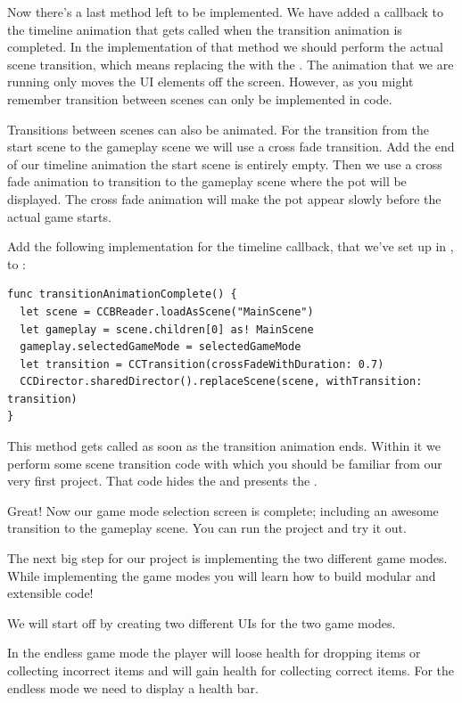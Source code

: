 Now there's a last method left to be implemented. We have added a callback to
the timeline animation that gets called when the transition animation is
completed. In the implementation of that method we should perform the actual
scene transition, which means replacing the  with the
. The animation that we are running only moves the UI
elements off the screen. However, as you might remember transition between
scenes can only be implemented in code.

Transitions between scenes can also be animated. For the
transition from the start scene to the gameplay scene we will use a cross fade
transition. Add the end of our timeline animation the start scene is entirely
empty. Then we use a cross fade animation to transition to the gameplay scene
where the pot will be displayed. The cross fade animation will make the pot
appear slowly before the actual game starts.

\begin{leftbar}
Add the following implementation for the timeline callback, that we've set up in
\SB{}, to :
\begin{lstlisting}
func transitionAnimationComplete() {
  let scene = CCBReader.loadAsScene("MainScene")
  let gameplay = scene.children[0] as! MainScene
  gameplay.selectedGameMode = selectedGameMode
  let transition = CCTransition(crossFadeWithDuration: 0.7)
  CCDirector.sharedDirector().replaceScene(scene, withTransition: transition)
}
\end{lstlisting}
\end{leftbar}
This method gets called as soon as the transition animation ends. Within it we
perform some scene transition code with which you should be familiar from our
very first \SB{} project. That code hides the  and
presents the .

Great! Now our game mode selection screen is complete; including an awesome
transition to the gameplay scene. You can run the project and try it out.

The next big step for our project is implementing the two different game modes.
While implementing the game modes you will learn how to build modular and
extensible code! 

We will start off by creating two different UIs for the two game
modes. 

In the endless game mode the player will loose health for dropping items
or collecting incorrect items and will gain health for collecting correct items. For the endless mode we need to
display a health bar. 

